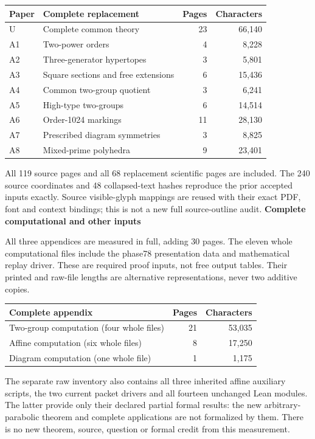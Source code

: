 \documentclass[11pt,a4paper]{article}
\begin{document}
\begin{tabularx}{\textwidth}{@{}lLrr@{}}\toprule
Paper & Complete replacement & Pages & Characters\\\midrule
U & Complete common theory & 23 & 66,140 \\
A1 & Two-power orders & 4 & 8,228 \\
A2 & Three-generator hypertopes & 3 & 5,801 \\
A3 & Square sections and free extensions & 6 & 15,436 \\
A4 & Common two-group quotient & 3 & 6,241 \\
A5 & High-type two-groups & 6 & 14,514 \\
A6 & Order-1024 markings & 11 & 28,130 \\
A7 & Prescribed diagram symmetries & 3 & 8,825 \\
A8 & Mixed-prime polyhedra & 9 & 23,401 \\
\bottomrule\end{tabularx}\par
\normalsize
All 119 source pages and all 68 replacement scientific pages are included. The 240
source coordinates and 48 collapsed-text hashes reproduce the prior accepted inputs
exactly. Source visible-glyph mappings are reused with their exact PDF, font and
context bindings; this is not a new full source-outline audit.
\newpage
\textbf{Complete computational and other inputs}

All three appendices are measured in full, adding 30 pages. The eleven whole
computational files include the phase78 presentation data and mathematical replay
driver. These are required proof inputs, not free output tables. Their printed and
raw-file lengths are alternative representations, never two additive copies.

\small
\begin{tabularx}{\textwidth}{@{}Lrr@{}}\toprule
Complete appendix & Pages & Characters\\\midrule
Two-group computation (four whole files) & 21 & 53,035 \\
Affine computation (six whole files) & 8 & 17,250 \\
Diagram computation (one whole file) & 1 & 1,175 \\
\bottomrule\end{tabularx}\par
\normalsize
The separate raw inventory also contains all three inherited affine auxiliary
scripts, the two current packet drivers and all fourteen unchanged Lean
modules. The latter provide only their declared partial formal results: the new
arbitrary-parabolic theorem and complete applications are not formalized by them.
There is no new theorem, source, question or formal credit from this measurement.
\end{document}
